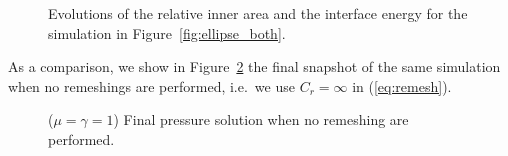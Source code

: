 \documentclass[a4paper,12pt,onecolumn]{article}
\begin{document}
\begin{figure}[htbp]
\centering
{}
\caption{Evolutions of the relative inner area and the interface energy for 
the simulation in Figure~\ref{fig:ellipse_both}.}
\label{fig:ellipse_both_volumes}
\end{figure}
As a comparison, we show in Figure~\ref{fig:ellipse_smooth} the final snapshot
of the same simulation when no remeshings are performed, i.e.\ we use $C_r=
\infty$ in (\ref{eq:remesh}). 
\begin{figure}[htbp]
\centering
{}
\caption{($\mu=\gamma=1$) Final pressure solution when no remeshing are 
performed.}
\label{fig:ellipse_smooth}
\end{figure}
\end{document}
